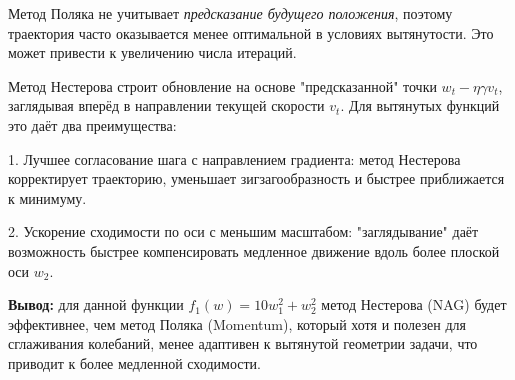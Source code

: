 Метод Поляка не учитывает \textit{предсказание будущего положения}, поэтому траектория часто оказывается менее оптимальной в условиях вытянутости. Это может привести к увеличению числа итераций.

Метод Нестерова строит обновление на основе "предсказанной" точки \( w_t - \eta \gamma v_t \), заглядывая вперёд в направлении текущей скорости \( v_t \). Для вытянутых функций это даёт два преимущества:

1. Лучшее согласование шага с направлением градиента:
метод Нестерова корректирует траекторию, уменьшает зигзагообразность и быстрее приближается к минимуму.

2. Ускорение сходимости по оси с меньшим масштабом:
"заглядывание" даёт возможность быстрее компенсировать медленное движение вдоль более плоской оси \( w_2 \).

\textbf{Вывод: } для данной функции \( f_1(w) = 10w_1^2 + w_2^2 \) метод Нестерова (NAG) будет эффективнее, чем метод Поляка (Momentum), который хотя и полезен для сглаживания колебаний, менее адаптивен к вытянутой геометрии задачи, что приводит к более медленной сходимости.
